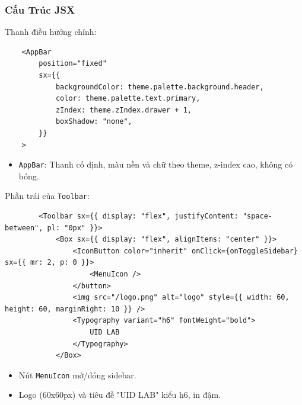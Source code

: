             \subsubsection{Cấu Trúc JSX}
                \hspace*{0.6cm}Thanh điều hướng chính:
                \begin{lstlisting}
    <AppBar
        position="fixed"
        sx={{
            backgroundColor: theme.palette.background.header,
            color: theme.palette.text.primary,
            zIndex: theme.zIndex.drawer + 1,
            boxShadow: "none",
        }}
    >
                \end{lstlisting}
                \begin{itemize}
                    \item \texttt{AppBar}: Thanh cố định, màu nền và chữ theo theme, z-index cao, không có bóng.
                \end{itemize}

                Phần trái của \texttt{Toolbar}:
                \begin{lstlisting}
        <Toolbar sx={{ display: "flex", justifyContent: "space-between", pl: "0px" }}>
            <Box sx={{ display: "flex", alignItems: "center" }}>
                <IconButton color="inherit" onClick={onToggleSidebar} sx={{ mr: 2, p: 0 }}>
                    <MenuIcon />
                </button>
                <img src="/logo.png" alt="logo" style={{ width: 60, height: 60, marginRight: 10 }} />
                <Typography variant="h6" fontWeight="bold">
                    UID LAB
                </Typography>
            </Box>
                \end{lstlisting}
                \begin{itemize}
                    \item Nút \texttt{MenuIcon} mở/đóng sidebar.
                    \item Logo (60x60px) và tiêu đề "UID LAB" kiểu h6, in đậm.
                \end{itemize}

